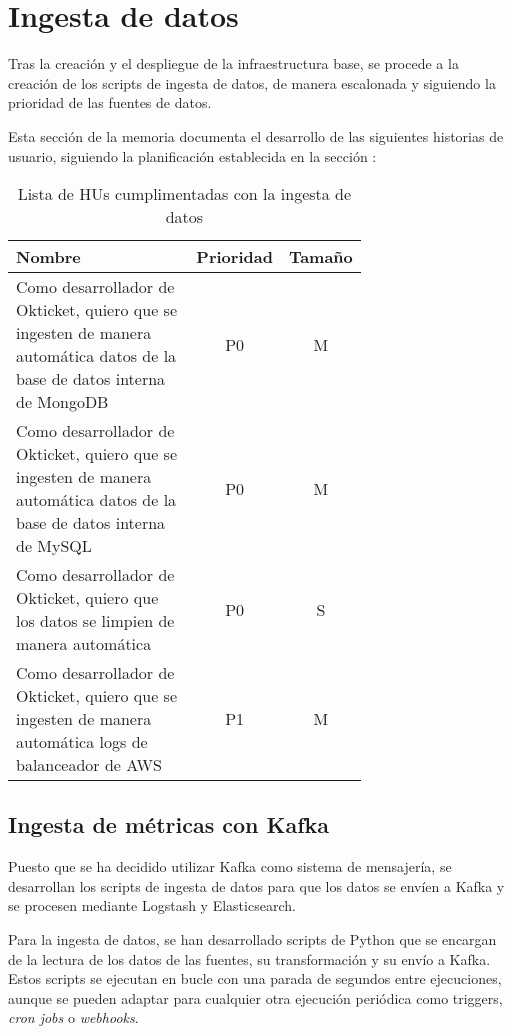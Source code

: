 \section{Ingesta de datos}\label{sec:impl_ingesta}
Tras la creación y el despliegue de la infraestructura base, se procede a la
creación de los scripts de ingesta de datos, de manera escalonada y siguiendo
la prioridad de las fuentes de datos.

Esta sección de la memoria documenta el desarrollo de las siguientes historias
de usuario, siguiendo la planificación establecida en la sección :

\begin{table}[H]
	\centering
	\begin{tabular}{|p{0.7\linewidth}|c|c|}
		\hline
		\textbf{Nombre} & \textbf{Prioridad} & \textbf{Tamaño} \\
		\hline
		\hline
		Como desarrollador de Okticket, quiero que se ingesten de manera automática datos de la base de datos interna de MongoDB & P0\cellcolor{red!50} & M\cellcolor{yellow!50} \\
		\hline
		Como desarrollador de Okticket, quiero que se ingesten de manera automática datos de la base de datos interna de MySQL & P0\cellcolor{red!50} & M\cellcolor{yellow!50} \\
		\hline
		Como desarrollador de Okticket, quiero que los datos se limpien de manera automática & P0\cellcolor{red!50} & S\cellcolor{green!25} \\
		\hline
		Como desarrollador de Okticket, quiero que se ingesten de manera automática logs de balanceador de AWS & P1\cellcolor{orange!50} & M\cellcolor{yellow!50} \\
		\hline
  \end{tabular}
  \caption{Lista de HUs cumplimentadas con la ingesta de datos}
  \label{tab:impl_ingesta}
\end{table}


\newpage{}
\subsection{Ingesta de métricas con Kafka}\label{subsec:impl_ingesta_kafka}
Puesto que se ha decidido utilizar Kafka como sistema de mensajería, se
desarrollan los scripts de ingesta de datos para que los datos se envíen a
Kafka y se procesen mediante Logstash y Elasticsearch.

Para la ingesta de datos, se han desarrollado scripts de Python que se encargan
de la lectura de los datos de las fuentes, su transformación y su envío a Kafka.
Estos scripts se ejecutan en bucle con una parada de segundos entre ejecuciones,
aunque se pueden adaptar para cualquier otra ejecución periódica como triggers,
\textit{cron jobs} o \textit{webhooks}.

